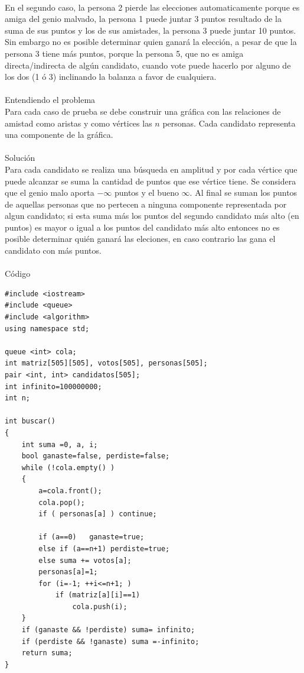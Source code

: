\documentclass[12pt]{article}
\begin{document}
{{{\\En el segundo caso, la persona 2 pierde las elecciones automaticamente porque es amiga del genio malvado, la persona 1 puede juntar 3 puntos resultado de la suma de sus puntos y los de sus amistades, la persona 3 puede juntar 10 puntos. Sin embargo no es posible determinar quien ganará la elección, a pesar de que la persona 3 tiene
más puntos, porque la persona 5, que no es amiga directa/indirecta de algún candidato, cuando vote puede hacerlo por alguno de los dos (1 ó 3) inclinando la balanza a favor de cualquiera.\\
\\
\textrm{\large Entendiendo el problema}\\
Para cada caso de prueba se debe construir una gráfica con las relaciones de amistad como aristas y como vértices las $n$ personas. Cada candidato representa una componente de la gráfica. \\
\\
\textrm{\large Solución}\\
Para cada candidato se realiza una búsqueda en amplitud y por cada vértice que puede alcanzar se suma la cantidad de puntos que ese vértice tiene. Se considera que el genio malo aporta $-\infty$ puntos y el bueno $\infty$. Al final se suman los puntos de aquellas personas que no pertecen a ninguna componente representada por algun candidato; si esta suma más los puntos del segundo candidato más alto (en puntos) es mayor o igual a los puntos del candidato más alto entonces no es posible determinar quién ganará las eleciones, en caso contrario las gana el candidato con más puntos.\\
\\
\textrm{\large Código}\\
\begin{verbatim}
#include <iostream>
#include <queue>
#include <algorithm>
using namespace std;
 
queue <int> cola;
int matriz[505][505], votos[505], personas[505];
pair <int, int> candidatos[505];
int infinito=100000000;
int n;
 
int buscar()
{
    int suma =0, a, i;
    bool ganaste=false, perdiste=false;
    while (!cola.empty() )
    {
        a=cola.front();
        cola.pop();
        if ( personas[a] ) continue;
 
        if (a==0)   ganaste=true;
        else if (a==n+1) perdiste=true;
        else suma += votos[a];
        personas[a]=1;
        for (i=-1; ++i<=n+1; )
            if (matriz[a][i]==1)
                cola.push(i);
    }
    if (ganaste && !perdiste) suma= infinito;
    if (perdiste && !ganaste) suma =-infinito;
    return suma;
}
 

\end{verbatim}}}}
\end{document}
